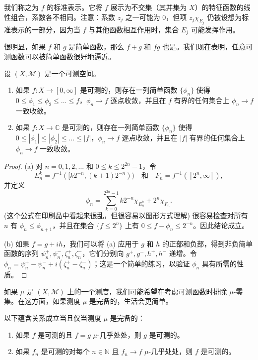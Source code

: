 \documentclass[lang=cn,10pt,thmcnt=section]{elegantbook}
\begin{document}
我们称之为 $f$ 的标准表示。它将 $f$ 展示为不交集（其并集为 $X$）的特征函数的线性组合，系数各不相同。注意：系数 $z_j$ 之一可能为 0，但项 $z_j \chi_{E_j}$ 仍被设想为标准表示的一部分，因为当 $f$ 与其他函数相互作用时，集合 $E_j$ 可能发挥作用。

很明显，如果 $f$ 和 $g$ 是简单函数，那么 $f+g$ 和 $fg$ 也是。我们现在表明，任意可测函数可以被简单函数很好地逼近。

\begin{theorem}\label{theorem2.10}
设 $(X, \mathcal{M})$ 是一个可测空间。
\begin{enumerate}[label=\alph*.]
\item 如果 $f : X \to [0, \infty]$ 是可测的，则存在一列简单函数 $\{\phi_n\}$ 使得 $0 \le \phi_1 \le \phi_2 \le \dots \le f$，$\phi_n \to f$ 逐点收敛，并且在 $f$ 有界的任何集合上 $\phi_n \to f$ 一致收敛。
\item 如果 $f : X \to \mathbb{C}$ 是可测的，则存在一列简单函数 $\{\phi_n\}$ 使得 $0 \le |\phi_1| \le |\phi_2| \le \dots \le |f|$，$\phi_n \to f$ 逐点收敛，并且在 $|f|$ 有界的任何集合上 $\phi_n \to f$ 一致收敛。
\end{enumerate}
\end{theorem}

\begin{proof}
(a) 对 $n = 0, 1, 2, \dots$ 和 $0 \le k \le 2^{2n}-1$，令
\[ E_n^k = f^{-1}([k2^{-n}, (k+1)2^{-n})) \quad \text{和} \quad F_n = f^{-1}([2^n, \infty]), \]
并定义
\[ \phi_n = \sum_{k=0}^{2^{2n}-1} k2^{-n} \chi_{E_n^k} + 2^n \chi_{F_n}. \]
(这个公式在印刷品中看起来很乱，但很容易以图形方式理解) 很容易检查对所有 $n$ 有 $\phi_n \le \phi_{n+1}$，并且在集合 $\{f \le 2^n\}$ 上有 $0 \le f - \phi_n \le 2^{-n}$。因此结论成立。

(b) 如果 $f = g + ih$，我们可以将 (a) 应用于 $g$ 和 $h$ 的正部和负部，得到非负简单函数的序列 $\psi_n^+, \psi_n^-, \zeta_n^+, \zeta_n^-$，它们分别向 $g^+, g^-, h^+, h^-$ 递增。令 $\phi_n = \psi_n^+ - \psi_n^- + i(\zeta_n^+ - \zeta_n^-)$；这是一个简单的练习，以验证 $\phi_n$ 具有所需的性质。
\end{proof}

如果 $\mu$ 是 $(X, \mathcal{M})$ 上的一个测度，我们可能希望在考虑可测函数时排除 $\mu$-零集。在这方面，如果测度 $\mu$ 是完备的，生活会更简单。

\begin{proposition}\label{proposition2.11}
以下蕴含关系成立当且仅当测度 $\mu$ 是完备的：
\begin{enumerate}[label=\alph*.]
\item 如果 $f$ 是可测的且 $f=g$ $\mu$-几乎处处，则 $g$ 是可测的。
\item 如果 $f_n$ 是可测的对每个 $n \in \mathbb{N}$ 且 $f_n \to f$ $\mu$-几乎处处，则 $f$ 是可测的。
\end{enumerate}
\end{proposition}
\end{document}
